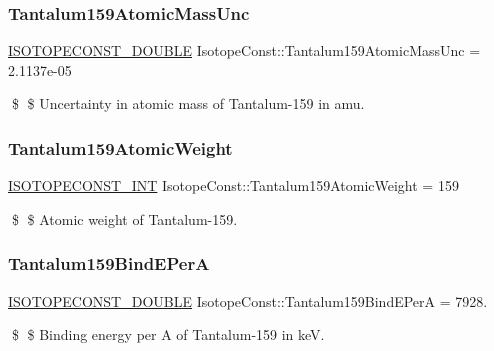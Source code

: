 \subsubsection{\texorpdfstring{Tantalum159\+Atomic\+Mass\+Unc}{Tantalum159AtomicMassUnc}}
{\footnotesize\ttfamily \mbox{\hyperlink{group___isotope_const-_macros_ga8f45a7272ce02c0b4c65c44636ed719a}{I\+S\+O\+T\+O\+P\+E\+C\+O\+N\+S\+T\+\_\+\+D\+O\+U\+B\+LE}} Isotope\+Const\+::\+Tantalum159\+Atomic\+Mass\+Unc = 2.\+1137e-\/05}

\$ \$ Uncertainty in atomic mass of Tantalum-\/159 in amu. \mbox{\label{group___isotope_const-_tantalum-_ta159_gaf6ec256858cf86e7fc9265165471b1c9}} 
\subsubsection{\texorpdfstring{Tantalum159\+Atomic\+Weight}{Tantalum159AtomicWeight}}
{\footnotesize\ttfamily \mbox{\hyperlink{group___isotope_const-_macros_ga5f18360b3e99483a35c32d789e62621c}{I\+S\+O\+T\+O\+P\+E\+C\+O\+N\+S\+T\+\_\+\+I\+NT}} Isotope\+Const\+::\+Tantalum159\+Atomic\+Weight = 159}

\$ \$ Atomic weight of Tantalum-\/159. \mbox{\label{group___isotope_const-_tantalum-_ta159_ga829641c74fab0be57c7485682ee7b5f1}} 
\subsubsection{\texorpdfstring{Tantalum159\+Bind\+E\+PerA}{Tantalum159BindEPerA}}
{\footnotesize\ttfamily \mbox{\hyperlink{group___isotope_const-_macros_ga8f45a7272ce02c0b4c65c44636ed719a}{I\+S\+O\+T\+O\+P\+E\+C\+O\+N\+S\+T\+\_\+\+D\+O\+U\+B\+LE}} Isotope\+Const\+::\+Tantalum159\+Bind\+E\+PerA = 7928.}

\$ \$ Binding energy per A of Tantalum-\/159 in keV. \mbox{\label{group___isotope_const-_tantalum-_ta159_ga468ce1fbf8239bbcafb7ce52e571ceea}} 

